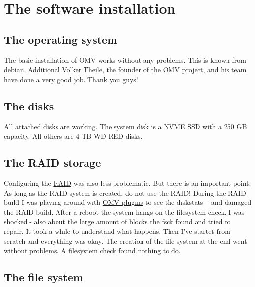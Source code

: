 \section{The software installation}

\subsection{The operating system}

The basic installation of \gls{OMV} works without any problems. This is known
from debian. Additional \href{https://www.openmediavault.org/?page_id=1206}{Volker Theile},
the founder of the \gls{OMV} project, and his team have done a very good job.
Thank you guys!


\subsection{The disks}

All attached disks are working. The system disk is a NVME SSD with a 250 GB
capacity. All others are 4 TB WD RED disks.


\subsection{The RAID storage}

Configuring the \href{https://en.wikipedia.org/wiki/RAID}{RAID} was also less
problematic. But there is an important point: As long as the RAID system is
created, do not use the RAID! During the RAID build I was playing around with
\href{https://www.openmediavault.org/?page_id=2014}{OMV plugins} to see the
diskstats -- and damaged the RAID build. After a reboot the system hangs on
the filesystem check. I was shocked - also about the large amount of blocks
the fsck found and tried to repair. It took a while to understand what happens.
Then I've startet from scratch and everything was okay. The creation of the
file system at the end went without problems. A filesystem check found nothing
to do.


\subsection{The file system}

